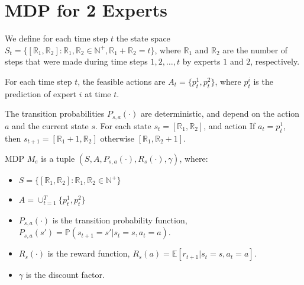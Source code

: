\documentclass[a4paper, 12pt]{article}
\begin{document}
\section*{MDP for 2 Experts}


We define for each time step $t$ the state space $S_t = \{ [ \mathbb{R}_1 ,  \mathbb{R}_2 ] : \mathbb{R}_1, \mathbb{R}_2 \in \mathbb{N}^+ , \mathbb{R}_1 + \mathbb{R}_2 = t \}$,  
where $\mathbb{R}_1$ and $\mathbb{R}_2$ are the number of steps that were made during time steps $1, 2, \ldots, t$ by experts $1$ and $2$, respectively.

For each time step $t$, the feasible actions are $A_t = \{p_t^1, p_t^2\}$, where $p_t^i$ is the prediction of expert $i$ at time $t$.

\medskip

The transition probabilities $P_{s,a}(\cdot)$ are deterministic, and depend on the action $a$ and the current state $s$.
For each state $s_t = [ \mathbb{R}_1 ,  \mathbb{R}_2 ]$, and action If $a_t = p_t^1$, then $s_{t+1} = [ \mathbb{R}_1 + 1 ,  \mathbb{R}_2 ]$ otherwise $[ \mathbb{R}_1 ,  \mathbb{R}_2 + 1 ]$.


\bigskip

MDP $M_e$ is a tuple $(S, A, P_{s,a}(\cdot) , R_s(\cdot), \gamma)$, where:
\begin{itemize}
    \item $S = \{ [ \mathbb{R}_1 ,  \mathbb{R}_2 ] : \mathbb{R}_1, \mathbb{R}_2 \in \mathbb{N}^+ \}$ 
    \item $A =  \cup_{t=1}^T \{p_t^1, p_t^2\}$ 
    \item $P_{s,a}(\cdot)$ is the transition probability function, $P_{s,a}(s') = \mathbb{P}(s_{t+1} = s' | s_t = s, a_t = a)$.
    \item $R_s(\cdot)$ is the reward function, $R_s(a) = \mathbb{E}[r_{t+1} | s_t = s, a_t = a]$.
    \item $\gamma$ is the discount factor.
\end{itemize}
\end{document}
